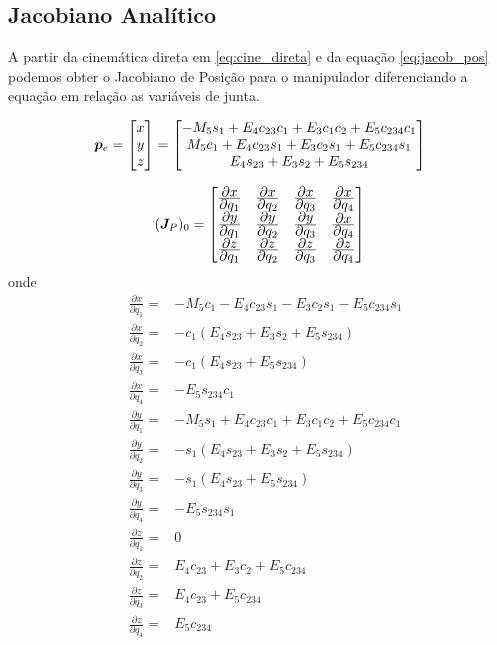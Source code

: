 \subsection{Jacobiano Analítico}
A partir da cinemática direta em \eqref{eq:cine_direta} e da equação \ref{eq:jacob_pos} podemos obter o Jacobiano de Posição para o manipulador diferenciando a equação em relação as variáveis de junta.

\begin{equation}
\bm{p}_e = \begin{bmatrix}x \\ y \\ z\end{bmatrix} =
\begin{bmatrix}
   -M_5 s_1 + E_4 c_{23}c_1 + E_3 c_1 c_2 + E_5 c_{234} c_1 \\
     M_5 c_1+E_4 c_{23} s_1 + E_3 c_2 s_1 + E_5 c_{234} s_1 \\
   						 E_4 s_{23} + E_3 s_2 + E_5 s_{234} \\
\end{bmatrix}
\end{equation}

\begin{equation}
(\bm{J}_P)_0 = 
\begin{bmatrix}
	\frac{\displaystyle \partial x}{\displaystyle \partial q_1} & \frac{\displaystyle \partial x}{\displaystyle \partial q_2} & \frac{\displaystyle \partial x}{\displaystyle \partial q_3} & \frac{\displaystyle \partial x}{\displaystyle \partial q_4}  \\
	\frac{\displaystyle \partial y}{\displaystyle \partial q_1} & \frac{\displaystyle \partial y}{\displaystyle \partial q_2} & \frac{\displaystyle \partial y}{\displaystyle \partial q_3} & \frac{\displaystyle \partial x}{\displaystyle \partial q_4}  \\
	\frac{\displaystyle \partial z}{\displaystyle \partial q_1} & \frac{\displaystyle \partial z}{\displaystyle \partial q_2} & \frac{\displaystyle \partial z}{\displaystyle \partial q_3} & \frac{\displaystyle \partial z}{\displaystyle \partial q_4}  \\
\end{bmatrix}
\end{equation}
onde
\begin{align*}
&\frac{\partial x}{\partial q_1} =& - M_5c_1 - E_4c_{23}s_1 - E_3c_2s_1 - E_5c_{234}s_1  \\
&\frac{\partial x}{\partial q_2} =& -c_1(E_4s_{23}+E_3s_2+E_5s_{234}) \\
&\frac{\partial x}{\partial q_3} =& -c_1(E_4s_{23}+E_5s_{234}) \\
&\frac{\partial x}{\partial q_4} =& -E_5s_{234}c_1 \\
&\frac{\partial y}{\partial q_1} =& -M_5s_1+E_4c_{23}c_1+E_3c_1c_2+E_5c_{234}c_1 \\
&\frac{\partial y}{\partial q_2} =& -s_1(E_4s_{23}+E_3s_2+E_5s_{234}) \\
&\frac{\partial y}{\partial q_3} =& -s_1(E_4s_{23}+E_5s_{234}) \\
&\frac{\partial y}{\partial q_4} =& -E_5s_{234}s_1 \\ 
&\frac{\partial z}{\partial q_1} =& 0 \\ 
&\frac{\partial z}{\partial q_2} =& E_4c_{23}+E_3c_2+E_5c_{234} \\
&\frac{\partial z}{\partial q_3} =& E_4c_{23}+E_5c_{234}\\
&\frac{\partial z}{\partial q_4} =& E_{5}c_{234} 
\end{align*}

